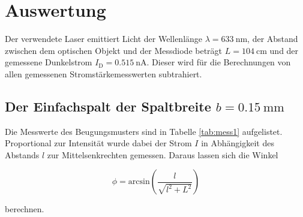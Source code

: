 \section{Auswertung}
\label{sec:Auswertung}

Der verwendete Laser emittiert Licht der Wellenlänge
$\lambda = \SI{633}{\nano\meter}$, der Abstand zwischen
dem optischen Objekt und der Messdiode beträgt $L = \SI{104}{\centi\meter}$
und der gemessene Dunkelstrom $I_\text{D} = \SI{0.515}{\nano\ampere}$.
Dieser wird für die Berechnungen von allen gemessenen Stromstärkemesswerten
subtrahiert.

\subsection{Der Einfachspalt der Spaltbreite $b = \SI{0.15}{\milli\meter}$}

Die Messwerte des Beugungsmusters sind in Tabelle \ref{tab:mess1} aufgelistet.
Proportional zur Intensität wurde dabei der Strom $I$ in Abhängigkeit des Abstands $l$
zur Mittelsenkrechten gemessen. Daraus lassen sich die Winkel

\begin{equation}
    \phi = \text{arcsin} \left(\frac{l}{\sqrt{l^2 + L^2}}\right)
\end{equation}

berechnen.

